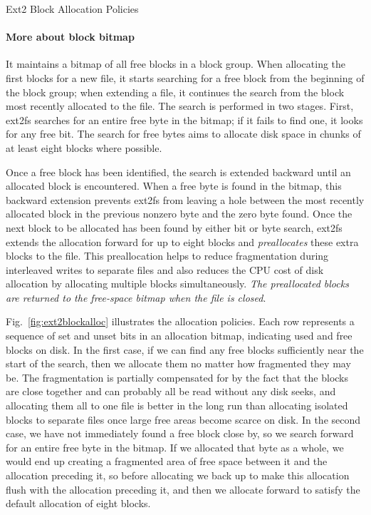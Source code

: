 \begin{frame}{Ext2 Block Allocation Policies}
  \label{fig:ext2blockalloc}%
  \centering%
  \mode<beamer>{ \texttt{[image: ext2blockalloc]} }%
\end{frame}

\paragraph{More about block bitmap}

It maintains a bitmap of all free blocks in a block group. When allocating the first
blocks for a new file, it starts searching for a free block from the beginning of the
block group; when extending a file, it continues the search from the block most recently
allocated to the file. The search is performed in two stages. First, ext2fs searches for
an entire free byte in the bitmap; if it fails to find one, it looks for any free bit.
The search for free bytes aims to allocate disk space in chunks of at least eight blocks
where possible.

Once a free block has been identified, the search is extended backward until an allocated
block is encountered. When a free byte is found in the bitmap, this backward extension
prevents ext2fs from leaving a hole between the most recently allocated block in the
previous nonzero byte and the zero byte found.  Once the next block to be allocated has
been found by either bit or byte search, ext2fs extends the allocation forward for up to
eight blocks and \emph{preallocates} these extra blocks to the file. This preallocation
helps to reduce fragmentation during interleaved writes to separate files and also reduces
the CPU cost of disk allocation by allocating multiple blocks simultaneously. \emph{The
  preallocated blocks are returned to the free-space bitmap when the file is closed}.

Fig.~\ref{fig:ext2blockalloc} illustrates the allocation policies. Each row represents a
sequence of set and unset bits in an allocation bitmap, indicating used and free blocks on
disk. In the first case, if we can find any free blocks sufficiently near the start of the
search, then we allocate them no matter how fragmented they may be. The fragmentation is
partially compensated for by the fact that the blocks are close together and can probably
all be read without any disk seeks, and allocating them all to one file is better in the
long run than allocating isolated blocks to separate files once large free areas become
scarce on disk. In the second case, we have not immediately found a free block close by,
so we search forward for an entire free byte in the bitmap. If we allocated that byte as a
whole, we would end up creating a fragmented area of free space between it and the
allocation preceding it, so before allocating we back up to make this allocation flush
with the allocation preceding it, and then we allocate forward to satisfy the default
allocation of eight blocks.

